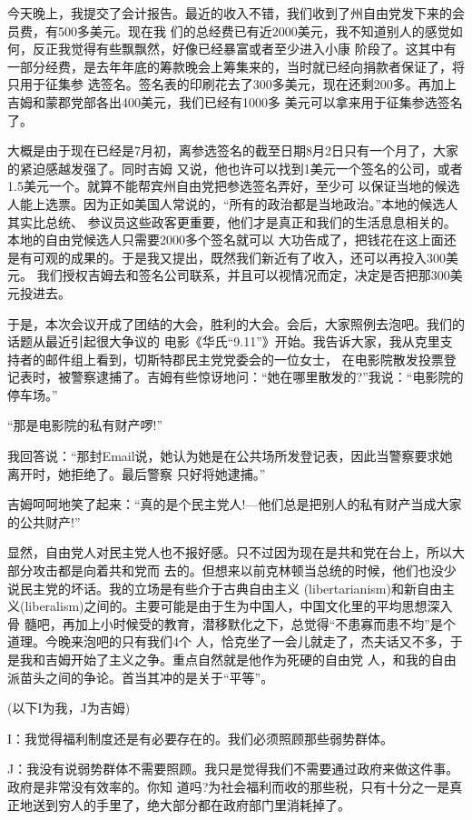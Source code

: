 ﻿\documentclass[11pt]{article}
\begin{document}
今天晚上，我提交了会计报告。最近的收入不错，我们收到了州自由党发下来的会员费，有500多美元。现在我
们的总经费已有近2000美元，我不知道别人的感觉如何，反正我觉得有些飘飘然，好像已经暴富或者至少进入小康
阶段了。这其中有一部分经费，是去年年底的筹款晚会上筹集来的，当时就已经向捐款者保证了，将只用于征集参
选签名。签名表的印刷花去了300多美元，现在还剩200多。再加上吉姆和蒙郡党部各出400美元，我们已经有1000多
美元可以拿来用于征集参选签名了。

大概是由于现在已经是7月初，离参选签名的截至日期8月2日只有一个月了，大家的紧迫感越发强了。同时吉姆
又说，他也许可以找到1美元一个签名的公司，或者1.5美元一个。就算不能帮宾州自由党把参选签名弄好，至少可
以保证当地的候选人能上选票。因为正如美国人常说的，``所有的政治都是当地政治。''本地的候选人其实比总统、
参议员这些政客更重要，他们才是真正和我们的生活息息相关的。本地的自由党候选人只需要2000多个签名就可以
大功告成了，把钱花在这上面还是有可观的成果的。于是我又提出，既然我们新近有了收入，还可以再投入300美元。
我们授权吉姆去和签名公司联系，并且可以视情况而定，决定是否把那300美元投进去。

于是，本次会议开成了团结的大会，胜利的大会。会后，大家照例去泡吧。我们的话题从最近引起很大争议的
电影《华氏``9.11''》开始。我告诉大家，我从克里支持者的邮件组上看到，切斯特郡民主党党委会的一位女士，
在电影院散发投票登记表时，被警察逮捕了。吉姆有些惊讶地问：``她在哪里散发的?''我说：``电影院的停车场。''

``那是电影院的私有财产啰!''

我回答说：``那封Email说，她认为她是在公共场所发登记表，因此当警察要求她离开时，她拒绝了。最后警察
只好将她逮捕。''

吉姆呵呵地笑了起来：``真的是个民主党人!---他们总是把别人的私有财产当成大家的公共财产!''

显然，自由党人对民主党人也不报好感。只不过因为现在是共和党在台上，所以大部分攻击都是向着共和党而
去的。但想来以前克林顿当总统的时候，他们也没少说民主党的坏话。我的立场是有些介于古典自由主义
(libertarianism)和新自由主义(liberalism)之间的。主要可能是由于生为中国人，中国文化里的平均思想深入骨
髓吧，再加上小时候受的教育，潜移默化之下，总觉得``不患寡而患不均''是个道理。今晚来泡吧的只有我们4个
人，恰克坐了一会儿就走了，杰夫话又不多，于是我和吉姆开始了主义之争。重点自然就是他作为死硬的自由党
人，和我的自由派苗头之间的争论。首当其冲的是关于``平等''。

(以下I为我，J为吉姆)

I：我觉得福利制度还是有必要存在的。我们必须照顾那些弱势群体。

J：我没有说弱势群体不需要照顾。我只是觉得我们不需要通过政府来做这件事。政府是非常没有效率的。你知
道吗?为社会福利而收的那些税，只有十分之一是真正地送到穷人的手里了，绝大部分都在政府部门里消耗掉了。
\end{document}
